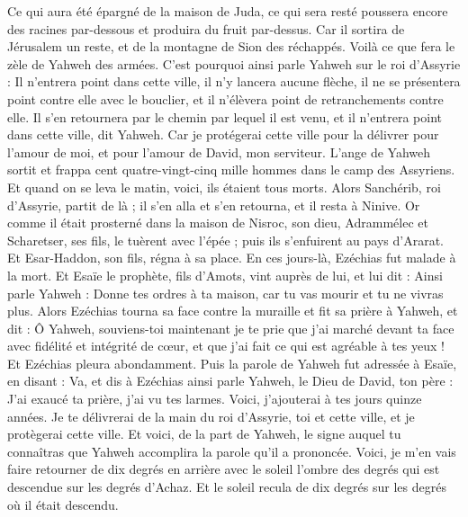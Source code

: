 \begin{multicols}{2}
Ce qui aura été épargné de la maison de Juda, ce qui sera resté poussera encore des racines par-dessous et produira du fruit par-dessus.
Car il sortira de Jérusalem un reste, et de la montagne de Sion des réchappés. Voilà ce que fera le zèle de Yahweh des armées.
C'est pourquoi ainsi parle Yahweh sur le roi d'Assyrie : Il n'entrera point dans cette ville, il n'y lancera aucune flèche, il ne se présentera point contre elle avec le bouclier, et il n'élèvera point de retranchements contre elle.
Il s'en retournera par le chemin par lequel il est venu, et il n'entrera point dans cette ville, dit Yahweh.
Car je protégerai cette ville pour la délivrer pour l'amour de moi, et pour l'amour de David, mon serviteur.
L'ange de Yahweh sortit et frappa cent quatre-vingt-cinq mille hommes dans le camp des Assyriens. Et quand on se leva le matin, voici, ils étaient tous morts.
Alors Sanchérib, roi d'Assyrie, partit de là ; il s'en alla et s'en retourna, et il resta à Ninive.
Or comme il était prosterné dans la maison de Nisroc, son dieu, Adrammélec et Scharetser, ses fils, le tuèrent avec l'épée ; puis ils s'enfuirent au pays d'Ararat. Et Esar-Haddon, son fils, régna à sa place.
\VerseOne{}En ces jours-là, Ezéchias fut malade à la mort. Et Esaïe le prophète, fils d'Amots, vint auprès de lui, et lui dit : Ainsi parle Yahweh : Donne tes ordres à ta maison, car tu vas mourir et tu ne vivras plus.
Alors Ezéchias tourna sa face contre la muraille et fit sa prière à Yahweh,
et dit : Ô Yahweh, souviens-toi maintenant je te prie que j'ai marché devant ta face avec fidélité et intégrité de cœur, et que j'ai fait ce qui est agréable à tes yeux ! Et Ezéchias pleura abondamment.
Puis la parole de Yahweh fut adressée à Esaïe, en disant :
Va, et dis à Ezéchias ainsi parle Yahweh, le Dieu de David, ton père : J'ai exaucé ta prière, j'ai vu tes larmes. Voici, j'ajouterai à tes jours quinze années.
Je te délivrerai de la main du roi d'Assyrie, toi et cette ville, et je protègerai cette ville.
Et voici, de la part de Yahweh, le signe auquel tu connaîtras que Yahweh accomplira la parole qu'il a prononcée.
Voici, je m'en vais faire retourner de dix degrés en arrière avec le soleil l'ombre des degrés qui est descendue sur les degrés d'Achaz. Et le soleil recula de dix degrés sur les degrés où il était descendu.

\end{multicols}
